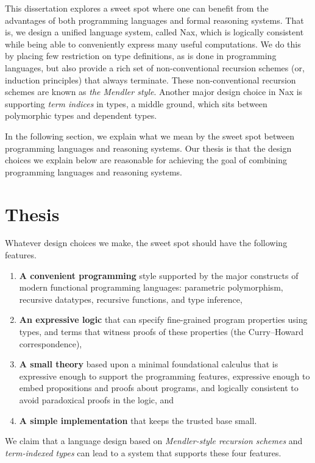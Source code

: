 This dissertation explores a sweet spot where one can benefit from
the advantages of both programming languages and formal reasoning systems.
That is, we design a unified language system, called Nax, which is
logically consistent while being able to conveniently express
many useful computations. We do this by placing few restriction on type definitions,
as is done in programming languages, but also provide a rich set of
non-conventional recursion schemes (or, induction principles) that
always terminate. These non-conventional recursion schemes are known as
\emph{the Mendler style}. Another major design choice in Nax is
supporting \emph{term indices} in types, a middle ground, which sits between
polymorphic types and dependent types.

In the following section, we explain what we mean by the sweet spot between
programming languages and reasoning systems. Our thesis is that
the design choices we explain below are reasonable for achieving
the goal of combining programming languages and reasoning systems.

\section{Thesis}\label{APP:sec:intro:thesis}
Whatever design choices we make, the sweet spot should have the following features.

\begin{enumerate}[(1)]
 \item \textbf{A convenient programming} style
         supported by the major constructs of
         modern functional programming languages: 
         parametric polymorphism, recursive datatypes,
         recursive functions, and type inference,
 \item \textbf{An expressive logic}
         that can specify fine-grained program properties using types, and terms that
         witness proofs of these properties 
         (the Curry--Howard correspondence),
 \item \textbf{A small theory} based upon a minimal foundational calculus that is
         expressive enough to support the programming features, expressive
         enough to embed propositions and proofs about
         programs, and logically consistent
         to avoid paradoxical proofs in the logic, and
 \item \textbf{A simple implementation} that keeps the trusted base small.
\end{enumerate}
We claim that a language design based on \emph{Mendler-style recursion schemes}
and \emph{term-indexed types} can lead to a system that supports these four
features.

